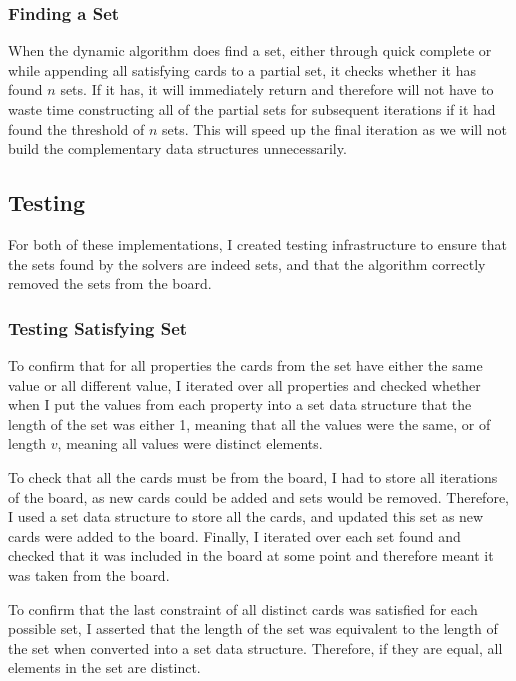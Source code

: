 \documentclass[pageno]{jpaper}
\begin{document}
\subsubsection{Finding a Set}

When the dynamic algorithm does find a set, either through quick complete or while appending all satisfying cards to a partial set, it checks whether it has found $n$ sets. If it has, it will immediately return and therefore will not have to waste time constructing all of the partial sets for subsequent iterations if it had found the threshold of $n$ sets. This will speed up the final iteration as we will not build the complementary data structures unnecessarily. 

\subsection{Testing}

For both of these implementations, I created testing infrastructure to ensure that the sets found by the solvers are indeed sets, and that the algorithm correctly removed the sets from the board. 

\subsubsection{Testing Satisfying Set}

To confirm that for all properties the cards from the set have either the same value or all different value, I iterated over all properties and checked whether when I put the values from each property into a set data structure that the length of the set was either 1, meaning that all the values were the same, or of length $v$, meaning all values were distinct elements. 

To check that all the cards must be from the board, I had to store all iterations of the board, as new cards could be added and sets would be removed. Therefore, I used a set data structure to store all the cards, and updated this set as new cards were added to the board. Finally, I iterated over each set found and checked that it was included in the board at some point and therefore meant it was taken from the board. 

To confirm that the last constraint of all distinct cards was satisfied for each possible set, I asserted that the length of the set was equivalent to the length of the set when converted into a set data structure. Therefore, if they are equal, all elements in the set are distinct.
\end{document}
